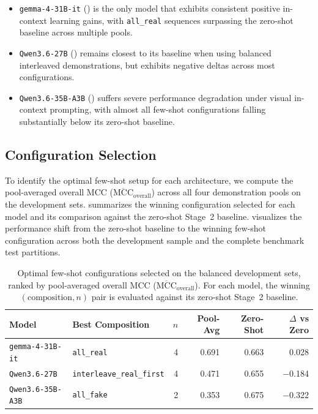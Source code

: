 \begin{itemize}
\begin{itemize}
        \item \texttt{gemma-4-31B-it} () is the only model that exhibits consistent positive in-context learning gains, with \texttt{all\_real} sequences surpassing the zero-shot baseline across multiple pools.
        \item \texttt{Qwen3.6-27B} () remains closest to its baseline when using balanced interleaved demonstrations, but exhibits negative deltas across most configurations.
        \item \texttt{Qwen3.6-35B-A3B} () suffers severe performance degradation under visual in-context prompting, with almost all few-shot configurations falling substantially below its zero-shot baseline.
    \end{itemize}
\end{itemize}

\subsection{Configuration Selection}
\label{subsec:fewshot_selection}

To identify the optimal few-shot setup for each architecture, we compute the pool-averaged overall MCC ($\overline{\text{MCC}}_{\text{overall}}$) across all four demonstration pools on the development sets.  summarizes the winning configuration selected for each model and its comparison against the zero-shot Stage~2 baseline.  visualizes the performance shift from the zero-shot baseline to the winning few-shot configuration across both the development sample and the complete benchmark test partitions.

\begin{table}[t]
	\centering
	\small
	\setlength{\tabcolsep}{6pt}
	\caption{Optimal few-shot configurations selected on the balanced development sets, ranked by pool-averaged overall MCC ($\overline{\text{MCC}}_{\text{overall}}$). For each model, the winning $(\text{composition}, n)$ pair is evaluated against its zero-shot Stage~2 baseline.}
	\label{tab:results_fewshot_winners}
	\begin{tabular}{llrrrr}
		\toprule
		\textbf{Model} & \textbf{Best Composition} & \textbf{$n$} & \textbf{Pool-Avg} & \textbf{Zero-Shot} & \textbf{$\Delta$ vs Zero} \\
		\midrule
		\texttt{gemma-4-31B-it}  & \texttt{all\_real}               & \num{4} & \num{0.691} & \num{0.663} & \num{+0.028} \\
		\texttt{Qwen3.6-27B}     & \texttt{interleave\_real\_first} & \num{4} & \num{0.471} & \num{0.655} & \num{-0.184} \\
		\texttt{Qwen3.6-35B-A3B} & \texttt{all\_fake}               & \num{2} & \num{0.353} & \num{0.675} & \num{-0.322} \\
		\bottomrule
	\end{tabular}
\end{table}

